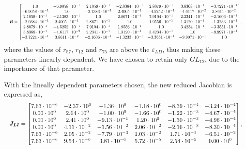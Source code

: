 \begin{equation}
\resizebox{\textwidth}{!}{$\displaystyle
\boldsymbol{R} =  \begin{bmatrix}
    1.0 & -6.9058 \cdot 10^{-1} & 2.1059 \cdot 10^{-1} & -2.0384 \cdot 10^{-1} & 2.8079 \cdot 10^{-1} & 3.8368 \cdot 10^{-1} & -3.7221 \cdot 10^{-1} \\
    -6.9058 \cdot 10^{-1} & 1.0 & -2.1383 \cdot 10^{-1} & 2.4005 \cdot 10^{-1} & -4.5252 \cdot 10^{-1} & -4.6117 \cdot 10^{-2} & 3.8611 \cdot 10^{-2} \\
    2.1059 \cdot 10^{-1} & -2.1383 \cdot 10^{-1} & 1.0 & 2.8671 \cdot 10^{-1} & 7.9104 \cdot 10^{-1} & 2.2341 \cdot 10^{-1} & -2.1606 \cdot 10^{-1} \\
    -2.0384 \cdot 10^{-1} & 2.4005 \cdot 10^{-1} & 2.8671 \cdot 10^{-1} & 1.0 & 1.9556 \cdot 10^{-1} & 1.3120 \cdot 10^{-1} & -1.3233 \cdot 10^{-1} \\
    2.8079 \cdot 10^{-1} & -4.5252 \cdot 10^{-1} & 7.9104 \cdot 10^{-1} & 1.9556 \cdot 10^{-1} & 1.0 & 3.4234 \cdot 10^{-1} & -3.3551 \cdot 10^{-1} \\
    3.8368 \cdot 10^{-1} & -4.6117 \cdot 10^{-2} & 2.2341 \cdot 10^{-1} & 1.3120 \cdot 10^{-1} & 3.4234 \cdot 10^{-1} & 1.0 & -9.9971 \cdot 10^{-1} \\
    -3.7221 \cdot 10^{-1} & 3.8611 \cdot 10^{-2} & -2.1606 \cdot 10^{-1} & -1.3233 \cdot 10^{-1} & -3.3551 \cdot 10^{-1} & -9.9971 \cdot 10^{-1} & 1.0
  \end{bmatrix},
  $}
\end{equation}
where the values of $r_{57}$, $r_{12}$ and $r_{75}$ are above the $\varepsilon_{LD}$, thus making these parameters linearly dependent. We have chosen to retain only $GL_{12}$, due to the importance of that parameter.

With the lineally dependent parameters chosen, the new reduced Jacobian is expressed as,
\begin{equation}
    \resizebox{\textwidth}{!}{$\displaystyle
    \boldsymbol{J_{LI}} = \begin{bmatrix}
      7.63 \cdot 10^{-6} & -2.37 \cdot 10^{0} & -1.36 \cdot 10^{0} & -1.18 \cdot 10^{0} & -8.39 \cdot 10^{-4} & -3.24 \cdot 10^{-4} \\
      0.00 \cdot 10^{0} & 2.64 \cdot 10^{0} & -1.00 \cdot 10^{0} & -1.66 \cdot 10^{0} & -1.22 \cdot 10^{-3} & -4.67 \cdot 10^{-4} \\
      0.00 \cdot 10^{0} & 2.41 \cdot 10^{0} & -9.13 \cdot 10^{-1} & 1.20 \cdot 10^{0} & -1.30 \cdot 10^{-3} & -4.96 \cdot 10^{-4} \\
      0.00 \cdot 10^{0} & 4.11 \cdot 10^{-2} & -1.56 \cdot 10^{-2} & 2.06 \cdot 10^{-2} & -2.16 \cdot 10^{-3} & -8.30 \cdot 10^{-4} \\
      7.63 \cdot 10^{-6} & 2.05 \cdot 10^{-2} & -7.79 \cdot 10^{-3} & 1.03 \cdot 10^{-2} & 1.71 \cdot 10^{-1} & -6.51 \cdot 10^{-2} \\
      7.63 \cdot 10^{-6} & 9.54 \cdot 10^{-6} & 3.81 \cdot 10^{-6} & 5.72 \cdot 10^{-5} & 2.54 \cdot 10^{-5} & 0.00 \cdot 10^{0}
    \end{bmatrix},
    $}
    \label{eq:jacobianredFPGA}
    \end{equation}
    

